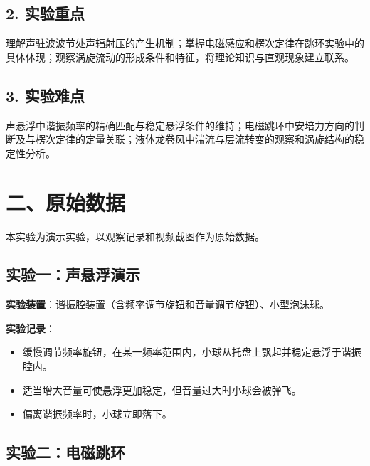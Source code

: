 \documentclass[a4paper,12pt]{article}
\begin{document}
\subsection{2. 实验重点}

理解声驻波波节处声辐射压的产生机制；掌握电磁感应和楞次定律在跳环实验中的具体体现；观察涡旋流动的形成条件和特征，将理论知识与直观现象建立联系。

\subsection{3. 实验难点}

声悬浮中谐振频率的精确匹配与稳定悬浮条件的维持；电磁跳环中安培力方向的判断及与楞次定律的定量关联；液体龙卷风中湍流与层流转变的观察和涡旋结构的稳定性分析。

\newpage

\section{二、原始数据}

本实验为演示实验，以观察记录和视频截图作为原始数据。

\subsection{实验一：声悬浮演示}

\noindent\textbf{实验装置}：谐振腔装置（含频率调节旋钮和音量调节旋钮）、小型泡沫球。

\noindent\textbf{实验记录}：
\begin{itemize}[nosep]
    \item 缓慢调节频率旋钮，在某一频率范围内，小球从托盘上飘起并稳定悬浮于谐振腔内。
    \item 适当增大音量可使悬浮更加稳定，但音量过大时小球会被弹飞。
    \item 偏离谐振频率时，小球立即落下。
\end{itemize}


\vspace{2cm}

\subsection{实验二：电磁跳环}
\end{document}
